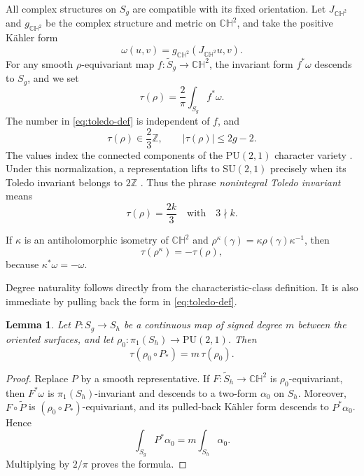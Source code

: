 \documentclass[12pt]{amsart}
\newtheorem{lemma}[theorem]{Lemma}
\theoremstyle{remark}
\newcommand{\CH}{\mathbb{CH}}
\newcommand{\PU}{\mathrm{PU}}
\newcommand{\SU}{\mathrm{SU}}
\begin{document}
All complex structures on $S_g$ are compatible with its fixed orientation.
Let $J_{\CH^2}$ and $g_{\CH^2}$ be the complex structure and metric on
$\CH^2$, and take the positive K\"ahler form
\[
 \omega(u,v)=g_{\CH^2}(J_{\CH^2}u,v).
\]
For any smooth $\rho$-equivariant map
$f:\widetilde S_g\to\CH^2$, the invariant form $f^*\omega$ descends to
$S_g$, and we set
\begin{equation}\label{eq:toledo-def}
 \tau(\rho)=\frac{2}{\pi}\int_{S_g}f^*\omega.
\end{equation}
The number in \eqref{eq:toledo-def} is independent of $f$,
and
\begin{equation}\label{eq:toledo-lattice}
 \tau(\rho)\in\frac23\mathbb Z,
 \qquad |\tau(\rho)|\le 2g-2.
\end{equation}
The values index the connected components of the $\PU(2,1)$ character
variety \cite{GKL,Toledo1989,Xia}.  Under this normalization, a representation
lifts to $\SU(2,1)$ precisely when its Toledo invariant belongs to
$2\mathbb Z$ \cite[Remark~2.2]{LoftinMcIntosh}.  Thus the phrase
\emph{nonintegral Toledo invariant} means
\[
 \tau(\rho)=\frac{2k}{3}\quad\text{with}\quad 3\nmid k.
\]

If $\kappa$ is an antiholomorphic isometry of $\CH^2$ and
$\rho^\kappa(\gamma)=\kappa\rho(\gamma)\kappa^{-1}$, then
\begin{equation}\label{eq:toledo-conjugation}
 \tau(\rho^\kappa)=-\tau(\rho),
\end{equation}
because $\kappa^*\omega=-\omega$.

Degree naturality follows directly from the characteristic-class definition.
It is also immediate by pulling back the form in \eqref{eq:toledo-def}.

\begin{lemma}\label{lem:naturality}
Let $P:S_g\to S_h$ be a continuous map of signed degree $m$ between the
oriented surfaces, and let
$\rho_0:\pi_1(S_h)\to\PU(2,1)$.  Then
\[
 \tau(\rho_0\circ P_*)=m\,\tau(\rho_0).
\]
\end{lemma}

\begin{proof}
Replace $P$ by a smooth representative.  If
$F:\widetilde S_h\to\CH^2$ is $\rho_0$-equivariant, then $F^*\omega$ is
$\pi_1(S_h)$-invariant and descends to a two-form $\alpha_0$ on $S_h$.
Moreover, $F\circ\widetilde P$ is $(\rho_0\circ P_*)$-equivariant, and its
pulled-back K\"ahler form descends to $P^*\alpha_0$.  Hence
\[
 \int_{S_g}P^*\alpha_0=m\int_{S_h}\alpha_0.
\]
Multiplying by $2/\pi$ proves the formula.
\end{proof}
\end{document}
